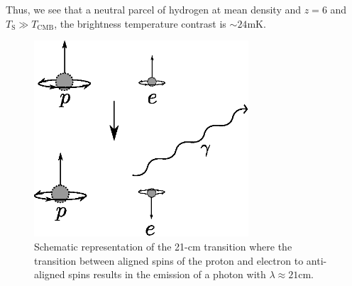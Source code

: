 Thus, we see that a neutral parcel of hydrogen at mean density and $z = 6$ and $T_{\text{S}} \gg T_{\text{CMB}}$, the brightness temperature contrast is $\sim 24\text{mK}$. 


\begin{figure}[!p]
  \centering
  \includegraphics[width=8cm]{21cmline.eps}
  \caption{Schematic representation of the 21-cm transition where the transition between aligned spins of the proton and electron to anti-aligned spins results in the emission of a photon with $\lambda \approx 21$cm. }
  \label{fig:21cmline}
\end{figure}

